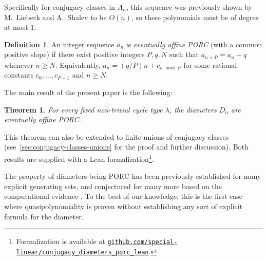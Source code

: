 \documentclass[DIV=12,10pt]{scrartcl}
\newtheorem{theorem}{Theorem}
\theoremstyle{definition}
\newtheorem{definition}{Definition}
\begin{document}
Specifically for conjugacy classes in $A_n$, this sequence was previously shown by M.~Liebeck and A.~Shalev \cite[Lemma~3.2]{LiebeckShalevDiametersSharpBounds} to be $O(n)$, so these polynomials must be of degree at most $1$.

\begin{definition}
An integer sequence $a_n$ is \emph{eventually affine PORC} (with a common positive slope) if there exist positive integers $P,q,N$ such that $a_{n+P} = a_n+q$ whenever $n\geqslant N$. Equivalently, $a_n = (q/P)n + c_{n \bmod P}$ for some rational constants $c_0,\ldots,c_{P-1}$ and $n\geqslant N$.
\end{definition}

The main result of the present paper is the following:

\begin{theorem}
	\label{thm:diameters-affine-porc}
	For every fixed non-trivial cycle type $\lambda$, the diameters $D_n$ are eventually affine PORC.
\end{theorem}

This theorem can also be extended to finite unions of conjugacy classes (see~\cref{sec:conjugacy-classes-unions} for the proof and further discussion). Both results are supplied with a Lean formalization\footnote{Formalization is available at \href{https://github.com/special-linear/conjugacy_diameters_porc_lean}{\texttt{github.com/special-linear/conjugacy\_diameters\_porc\_lean}}.}.

The property of diameters being PORC has been previously established for many explicit generating sets, and conjectured for many more based on the computational evidence \cite{CayleyPyGrowth}. To the best of our knowledge, this is the first case where quasipolynomiality is proven without establishing any sort of explicit formula for the diameter.
\end{document}
